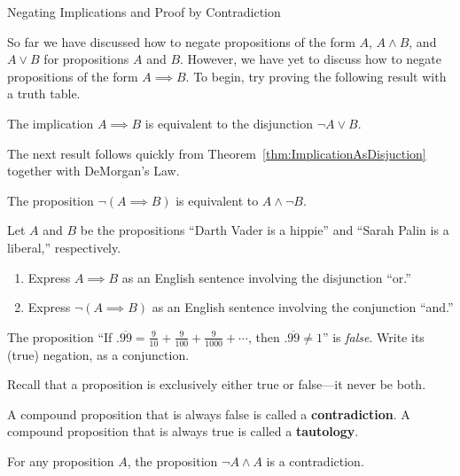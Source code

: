 \begin{section}{Negating Implications and Proof by Contradiction}

So far we have discussed how to negate propositions of the form $A$, $A\wedge B$, and $A\vee B$ for propositions $A$ and $B$.  However, we have yet to discuss how to negate propositions of the form $A\implies B$.  To begin, try proving the following result with a truth table.

\begin{theorem}\label{thm:ImplicationAsDisjuction}
The implication $A\implies B$ is equivalent to the disjunction $\neg A \vee B$.
\end{theorem}

The next result follows quickly from Theorem~\ref{thm:ImplicationAsDisjuction} together with DeMorgan's Law.

\begin{corollary}\label{cor:NegateImplication}
The proposition $\neg(A \implies B)$ is equivalent to $A \wedge \neg B$.
\end{corollary}

\begin{exercise}\label{exer:Darth Vader}
Let $A$ and $B$ be the propositions ``Darth Vader is a hippie'' and ``Sarah Palin is a liberal,'' respectively.
\begin{enumerate}[label=\textrm{(\alph*)}]
\item Express $A\implies B$ as an English sentence involving the disjunction ``or.''
\item Express $\neg(A\implies B)$ as an English sentence involving the conjunction ``and.''
\end{enumerate}
\end{exercise}

\begin{exercise}
The proposition ``If $.\overline{99}=\frac{9}{10}+\frac{9}{100}+\frac{9}{1000}+\cdots$, then $.\overline{99}\neq 1$'' is \emph{false}. Write its (true) negation, as a conjunction.
\end{exercise}

Recall that a proposition is exclusively either true or false---it never be both.

\begin{definition}
A compound proposition that is always false is called a \textbf{contradiction}.  A compound proposition that is always true is called a \textbf{tautology}.
\end{definition}

\begin{theorem}
For any proposition $A$, the proposition $\neg A\wedge A$ is a contradiction.
\end{theorem}


\end{section}
